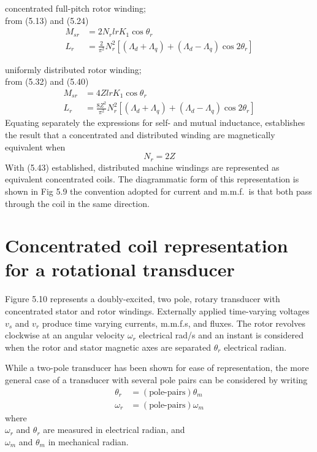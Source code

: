 \documentclass[a4paper,numbers=noenddot,12pt]{scrbook}
\begin{document}
concentrated full-pitch rotor winding;\\
from (5.13) and (5.24) 
\begin{align*}
    M_{sr}  & =  2 N_r l r K_1 \cos \theta_r \\
    L_r & = \frac{2}{\pi^2} N_r^2 [(\varLambda_d + \varLambda_q) + (\varLambda_d - \varLambda_q) \cos 2 \theta_r ] 
\end{align*}

uniformly distributed rotor winding;\\
from (5.32) and (5.40)
\begin{align*}
    M_{sr}  & =  4 Z l r K_1 \cos \theta_r \\
    L_r & = \frac{8 Z^2}{\pi^2} N_r^2 [(\varLambda_d + \varLambda_q) + (\varLambda_d - \varLambda_q) \cos 2 \theta_r ]
\end{align*}
Equating separately the expressions for self- and mutual inductance, establishes the result that a concentrated and distributed winding are magnetically equivalent when
\begin{equation}
    N_r = 2Z
\end{equation}
With (5.43) established, distributed machine windings are represented as equivalent concentrated coils. The diagrammatic form of this representation is shown in Fig 5.9 the convention adopted for current and m.m.f.\ is that both pass through the coil in the same direction.

\section{Concentrated coil representation for a rotational transducer}
Figure 5.10 represents a doubly-excited, two pole, rotary transducer with concentrated stator and rotor windings. Externally applied time-varying voltages $v_s$ and $v_r$ produce time varying currents, m.m.f.s, and fluxes. The rotor revolves clockwise at an angular velocity $\omega_r$ electrical rad/s and an instant is considered when the rotor and stator magnetic axes are separated $\theta_r$ electrical radian.

While a two-pole transducer has been shown for ease of representation, the more general case of a transducer with several pole pairs can be considered by writing
\begin{equation}
    \begin{aligned}
        \theta_r &= (\text{pole-pairs}) \theta_m \\
        \omega _r & = (\text{pole-pairs}) \omega_m
    \end{aligned}
\end{equation}
where\\
\hspace*{4em} $\omega_r$ and $\theta_r$ are measured in electrical radian, and\\
\hspace*{4em} $\omega_m$ and $\theta_m$ in mechanical radian.
\end{document}

